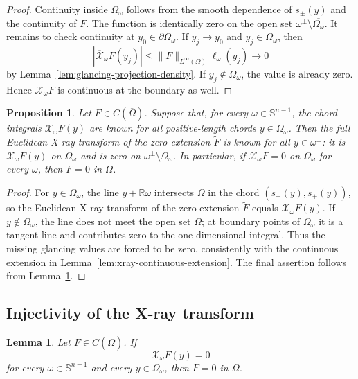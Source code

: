 \documentclass[11pt]{article}
\numberwithin{equation}{section}
\newtheorem{proposition}[theorem]{Proposition}
\newtheorem{lemma}[theorem]{Lemma}
\newcommand{\R}{\mathbb R}
\newcommand{\Sn}{\mathbb S^{n-1}}
\newcommand{\Om}{\Omega}
\newcommand{\Xray}{\mathcal X}
\begin{document}
\begin{proof}
Continuity inside \(\Omega_\omega\) follows from the smooth dependence of \(s_\pm(y)\) and the continuity of \(F\).  The function is identically zero on the open set \(\omega^\perp\setminus\overline{\Omega_\omega}\).  It remains to check continuity at \(y_0\in\partial\Omega_\omega\).  If \(y_j\to y_0\) and \(y_j\in\Omega_\omega\), then
\[
    |\overline{\Xray}_\omega F(y_j)|
    \le
    \|F\|_{L^\infty(\Omega)}\ell_\omega(y_j)
    \longrightarrow 0
\]
by Lemma~\ref{lem:glancing-projection-density}.  If \(y_j\notin\Omega_\omega\), the value is already zero.  Hence \(\overline{\Xray}_\omega F\) is continuous at the boundary as well.
\end{proof}

\begin{proposition}\label{prop:no-loss-glancing-xray}
Let \(F\in C(\overline\Omega)\).  Suppose that, for every \(\omega\in\Sn\), the chord integrals \(\Xray_\omega F(y)\) are known for all positive-length chords \(y\in\Omega_\omega\).  Then the full Euclidean X-ray transform of the zero extension \(\widetilde F\) is known for all \(y\in\omega^\perp\): it is \(\Xray_\omega F(y)\) on \(\Omega_\omega\) and is zero on \(\omega^\perp\setminus\Omega_\omega\).  In particular, if \(\Xray_\omega F=0\) on \(\Omega_\omega\) for every \(\omega\), then \(F=0\) in \(\Omega\).
\end{proposition}

\begin{proof}
For \(y\in\Omega_\omega\), the line \(y+\R\omega\) intersects \(\Omega\) in the chord \((s_-(y),s_+(y))\), so the Euclidean X-ray transform of the zero extension \(\widetilde F\) equals \(\Xray_\omega F(y)\).  If \(y\notin\Omega_\omega\), the line does not meet the open set \(\Omega\); at boundary points of \(\Omega_\omega\) it is a tangent line and contributes zero to the one-dimensional integral.  Thus the missing glancing values are forced to be zero, consistently with the continuous extension in Lemma~\ref{lem:xray-continuous-extension}.  The final assertion follows from Lemma~\ref{lem:xray-injective}.
\end{proof}


\subsection{Injectivity of the X-ray transform}\label{subsec:xray-injectivity}

\begin{lemma}\label{lem:xray-injective}
Let \(F\in C(\overline\Om)\).  If
\[
    \Xray_\omega F(y)=0
\]
for every \(\omega\in\Sn\) and every \(y\in \Omega_\omega\), then \(F=0\) in \(\Om\).
\end{lemma}
\end{document}
